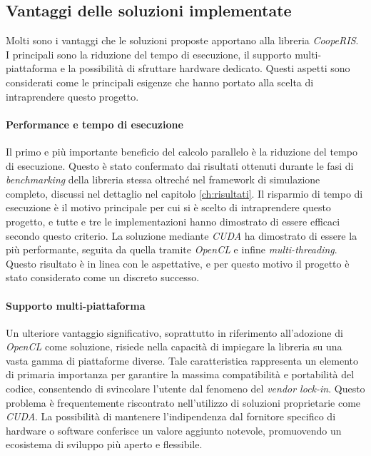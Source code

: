 \subsection{Vantaggi delle soluzioni implementate}
\label{subsec:vantaggi}

Molti sono i vantaggi che le soluzioni proposte apportano alla libreria \textit{CoopeRIS}.
I principali sono la riduzione del tempo di esecuzione, il supporto multi-piattaforma
e la possibilità di sfruttare hardware dedicato. Questi aspetti sono considerati
come le principali esigenze che hanno portato alla scelta di intraprendere
questo progetto.

\paragraph{Performance e tempo di esecuzione}
\label{para:performance}

Il primo e più importante beneficio del calcolo parallelo è la riduzione del
tempo di esecuzione. Questo è stato confermato dai risultati ottenuti durante le
fasi di \textit{benchmarking} della libreria stessa oltreché nel framework di
simulazione completo, discussi nel dettaglio nel capitolo \ref{ch:risultati}. Il
risparmio di tempo di esecuzione è il motivo principale per cui si è scelto di
intraprendere questo progetto, e tutte e tre le implementazioni hanno dimostrato
di essere efficaci secondo questo criterio. La soluzione mediante \textit{CUDA} ha
dimostrato di essere la più performante, seguita da quella tramite \textit{OpenCL}
e infine \textit{multi-threading}. Questo risultato è in linea con le aspettative,
e per questo motivo il progetto è stato considerato come un discreto successo.

\paragraph{Supporto multi-piattaforma}
\label{para:supporto}

Un ulteriore vantaggio significativo, soprattutto in riferimento all'adozione di
\textit{OpenCL} come soluzione, risiede nella capacità di impiegare la libreria su
una vasta gamma di piattaforme diverse. Tale caratteristica rappresenta un
elemento di primaria importanza per garantire la massima compatibilità e
portabilità del codice, consentendo di svincolare l'utente dal fenomeno del \textit{vendor
lock-in}. Questo problema è frequentemente riscontrato nell'utilizzo di soluzioni
proprietarie come \textit{CUDA}. La possibilità di mantenere l'indipendenza dal fornitore
specifico di hardware o software conferisce un valore aggiunto notevole,
promuovendo un ecosistema di sviluppo più aperto e flessibile.

